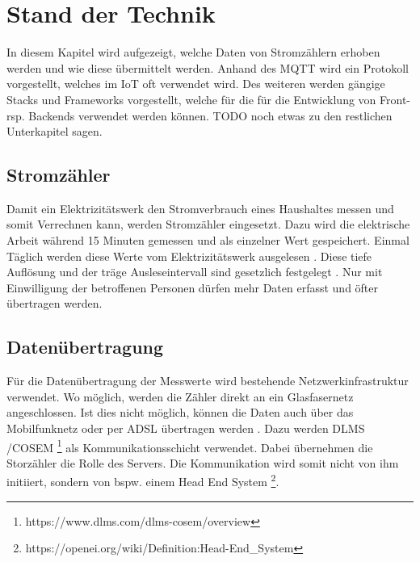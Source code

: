 \chapter{Stand der Technik}

In diesem Kapitel wird aufgezeigt,
welche Daten von Stromzählern erhoben werden und wie diese übermittelt werden.
Anhand des \ac{MQTT} wird ein Protokoll vorgestellt, welches im \ac{IoT} oft verwendet wird.
Des weiteren werden gängige Stacks und Frameworks vorgestellt,
welche für die für die Entwicklung von Front- rsp. Backends verwendet werden können.
TODO noch etwas zu den restlichen Unterkapitel sagen.

\section{Stromzähler}
Damit ein Elektrizitätswerk den Stromverbrauch eines Haushaltes messen und somit Verrechnen kann, werden Stromzähler eingesetzt.
Dazu wird die elektrische Arbeit während 15 Minuten gemessen und als einzelner Wert gespeichert.
Einmal Täglich werden diese Werte vom Elektrizitätswerk ausgelesen \parencite{smart_meter_faq}.
Diese tiefe Auflösung und der träge Ausleseintervall sind gesetzlich festgelegt \parencite{admin_strom_VV_art8d}.
Nur mit Einwilligung der betroffenen Personen dürfen mehr Daten erfasst und öfter übertragen werden.

\section{Datenübertragung}
Für die Datenübertragung der Messwerte wird bestehende Netzwerkinfrastruktur verwendet.
Wo möglich, werden die Zähler direkt an ein Glasfasernetz angeschlossen.
Ist dies nicht möglich, können die Daten auch über das Mobilfunknetz oder per ADSL übertragen werden \parencite{smart_meter_faq}.  %
Dazu werden DLMS /COSEM \footnote{https://www.dlms.com/dlms-cosem/overview} als Kommunikationsschicht verwendet.
Dabei übernehmen die Storzähler die Rolle des Servers.
Die Kommunikation wird somit nicht von ihm initiiert,
sondern von bspw. einem Head End System \footnote{https://openei.org/wiki/Definition:Head-End\_System}.

